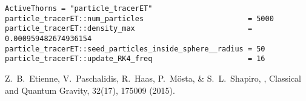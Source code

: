 \begin{verbatim}
ActiveThorns = "particle_tracerET"
particle_tracerET::num_particles                        = 5000
particle_tracerET::density_max                          = 0.000959482674936154
particle_tracerET::seed_particles_inside_sphere__radius = 50
particle_tracerET::update_RK4_freq                      = 16
\end{verbatim}


\begin{thebibliography}{1}


  Z.~B.~Etienne, V.~Paschalidis, R.~Haas, P.~Mösta, \& S.~L.~Shapiro,
  ,
  Classical and Quantum Gravity, 32(17), 175009 (2015).

\end{thebibliography}




